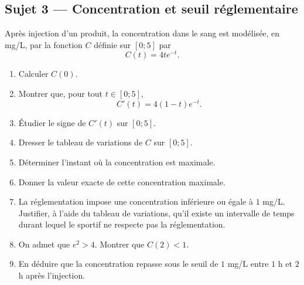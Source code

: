 \subsection*{Sujet 3 — Concentration et seuil réglementaire}
Après injection d'un produit, la concentration dans le sang est modélisée, en mg/L, par la fonction $C$ définie sur $[0;5]$ par
\[
  C(t)=4t e^{-t}.
\]
\begin{enumerate}
  \item Calculer $C(0)$.
  \item Montrer que, pour tout $t\in[0;5]$,
  \[
    C'(t)=4(1-t)e^{-t}.
  \]
  \item Étudier le signe de $C'(t)$ sur $[0;5]$.
  \item Dresser le tableau de variations de $C$ sur $[0;5]$.
  \item Déterminer l'instant où la concentration est maximale.
  \item Donner la valeur exacte de cette concentration maximale.
  \item La réglementation impose une concentration inférieure ou égale à $1$ mg/L. Justifier, à l'aide du tableau de variations, qu'il existe un intervalle de temps durant lequel le sportif ne respecte pas la réglementation.
  \item On admet que $e^2>4$. Montrer que $C(2)<1$.
  \item En déduire que la concentration repasse sous le seuil de $1$ mg/L entre $1$ h et $2$ h après l'injection.
\end{enumerate}
